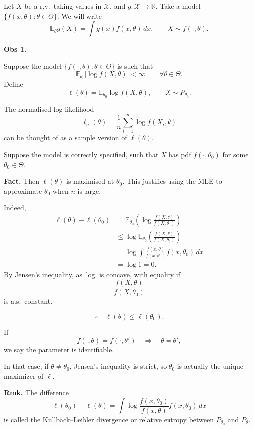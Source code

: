 \documentclass[11pt,a4paper]{article}
\begin{document}
Let $X$ be a r.v.\ taking values in $\mathcal{X}$, and
$g:\mathcal{X}\to\mathbb{R}$.
Take a model $\{f(x,\theta):\theta\in\Theta\}$.
We will write
\[
\mathbb{E}_{\theta}g(X)
=
\int g(x)f(x,\theta)\,dx,
\qquad
X\sim f(\cdot,\theta).
\]

\medskip
\noindent\textbf{Obs 1.}

Suppose the model $\{f(\cdot,\theta):\theta\in\Theta\}$ is such that
\[
\mathbb{E}_{\theta_0}\bigl|\log f(X,\theta)\bigr|
<
\infty
\qquad
\forall\theta\in\Theta.
\]
Define
\[
\ell(\theta)
=
\mathbb{E}_{\theta_0}\log f(X,\theta),
\qquad
X\sim P_{\theta_0}.
\]

The normalised log-likelihood
\[
\overline{\ell}_n(\theta)
=
\frac{1}{n}\sum_{i=1}^{n}\log f(X_i,\theta)
\]
can be thought of as a sample version of $\ell(\theta)$.

Suppose the model is correctly specified, such that $X$ has pdf
$f(\cdot,\theta_0)$ for some $\theta_0\in\Theta$.

\medskip
\noindent\textbf{Fact.}
Then $\ell(\theta)$ is maximised at $\theta_0$.
This justifies using the MLE to approximate $\theta_0$ when $n$ is large.

Indeed,
\[
\begin{aligned}
\ell(\theta)-\ell(\theta_0)
&=
\mathbb{E}_{\theta_0}
\left(
\log\frac{f(X,\theta)}{f(X,\theta_0)}
\right)
\\
&\leq
\log\mathbb{E}_{\theta_0}
\left(
\frac{f(X,\theta)}{f(X,\theta_0)}
\right)
\\
&=
\log\int
\frac{f(x,\theta)}{f(x,\theta_0)}
f(x,\theta_0)\,dx
\\
&=
\log 1=0.
\end{aligned}
\]
By Jensen's inequality, as $\log$ is concave, with equality if
\[
\frac{f(X,\theta)}{f(X,\theta_0)}
\]
is a.s.\ constant.

\[
\therefore\quad
\ell(\theta)\leq\ell(\theta_0).
\]

If
\[
f(\cdot,\theta)=f(\cdot,\theta')
\quad\Longrightarrow\quad
\theta=\theta',
\]
we say the parameter is \underline{identifiable}.

In that case, if $\theta\neq\theta_0$, Jensen's inequality is strict,
so $\theta_0$ is actually the unique maximizer of $\ell$.

\medskip
\noindent\textbf{Rmk.}
The difference
\[
\ell(\theta_0)-\ell(\theta)
=
\int
\log\frac{f(x,\theta_0)}{f(x,\theta)}
f(x,\theta_0)\,dx
\]
is called the \underline{Kullback--Leibler divergence}
or \underline{relative entropy} between $P_{\theta_0}$ and $P_\theta$.
\end{document}
